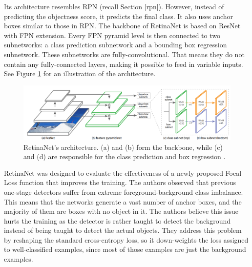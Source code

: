 Its architecture resembles RPN (recall Section \ref{rpn}). However, instead of predicting the objectness score, it predicts the final class. It also uses anchor boxes similar to those in RPN. The backbone of RetinaNet is based on ResNet with FPN extension. Every FPN pyramid level is then connected to two subnetworks: a class prediction subnetwork and a bounding box regression subnetwork. These subnetworks are fully-convolutional. That means they do not contain any fully-connected layers, making it possible to feed in variable inputs. See Figure \ref{fig:retinanet} for an illustration of the architecture.

\begin{figure}[h]
    \centering
    \includegraphics[width=\linewidth]{Sources/Figures/retinanet.png}
    \caption{RetinaNet's architecture. (a) and (b) form the backbone, while (c) and (d) are responsible for the class prediction and box regression \cite{retinanet}.}
    \label{fig:retinanet}
\end{figure}

RetinaNet was designed to evaluate the effectiveness of a newly proposed Focal Loss function that improves the training. The authors observed that previous one-stage detectors \cite{yolo1, yolo2, ssd} suffer from extreme foreground-background class imbalance. This means that the networks generate a vast number of anchor boxes, and the majority of them are boxes with no object in it. The authors believe this issue hurts the training as the detector is rather taught to detect the background instead of being taught to detect the actual objects.  They address this problem by reshaping the standard cross-entropy loss, so it down-weights the loss assigned to well-classified examples, since most of those examples are just the background examples.

